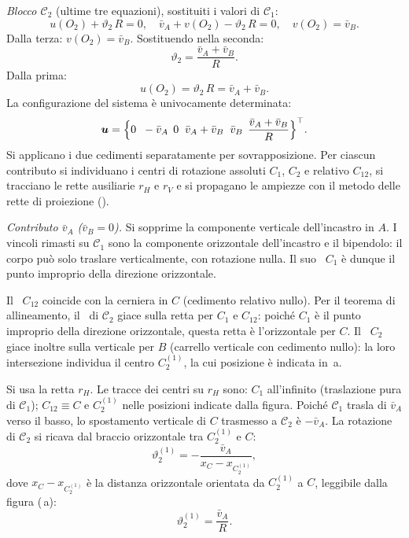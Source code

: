 \begin{esempio}
\begin{svolgimento}
		\noindent\textit{Blocco $\mathcal{C}_2$}
		(ultime tre equazioni), sostituiti i valori di
		$\mathcal{C}_1$:
		\begin{equation*}
			u(O_2) + \vartheta_2\,R = 0,\quad
			\bar{v}_A + v(O_2) - \vartheta_2\,R = 0,\quad
			v(O_2) = \bar{v}_B.
		\end{equation*}
		Dalla terza: $v(O_2) = \bar{v}_B$. Sostituendo
		nella seconda:
		\[
		\vartheta_2 = \frac{\bar{v}_A + \bar{v}_B}{R}.
		\]
		Dalla prima:
		\[
		u(O_2) = \vartheta_2\,R = \bar{v}_A + \bar{v}_B.
		\]
		La configurazione del sistema è univocamente
		determinata:
		\begin{equation*}
			\bm{u} =
			\Bigl\{
			0\;\;-\bar{v}_A\,\;0\;\;
			\bar{v}_A+\bar{v}_B\;\;\bar{v}_B\,\;
			\dfrac{\bar{v}_A+\bar{v}_B}{R}
			\Bigr\}^\top.
		\end{equation*}
		Si applicano i due cedimenti separatamente per
		sovrapposizione. Per ciascun contributo si
		individuano i centri di rotazione assoluti $C_1$,
		$C_2$ e relativo $C_{12}$, si tracciano le rette
		ausiliarie $r_H$ e $r_V$ e si propagano le
		ampiezze con il metodo delle rette di proiezione
		().
		
		\smallskip
		\noindent\textit{Contributo $\bar{v}_A$
			($\bar{v}_B = 0$).}
		Si sopprime la componente verticale dell'incastro
		in $A$. I vincoli rimasti su $\mathcal{C}_1$ sono
		la componente orizzontale dell'incastro e il
		bipendolo: il corpo può solo traslare verticalmente,
		con rotazione nulla. Il suo \CRa\ $C_1$ è dunque
		il punto improprio della direzione orizzontale.
		
		Il \CRr\ $C_{12}$ coincide con la cerniera in $C$
		(cedimento relativo nullo). Per il teorema di
		allineamento, il \CRa\ di $\mathcal{C}_2$ giace
		sulla retta per $C_1$ e $C_{12}$: poiché $C_1$ è
		il punto improprio della direzione orizzontale,
		questa retta è l'orizzontale per $C$. Il \CRa\
		$C_2$ giace inoltre sulla verticale per $B$
		(carrello verticale con cedimento nullo): la loro
		intersezione individua il centro $C_2^{(1)}$,
		la cui posizione è indicata in
		\,a.
		
		Si usa la retta $r_H$. Le tracce dei centri su
		$r_H$ sono: $C_1$ all'infinito (traslazione pura
		di $\mathcal{C}_1$); $C_{12}\equiv C$ e
		$C_2^{(1)}$ nelle posizioni indicate dalla figura.
		Poiché $\mathcal{C}_1$ trasla di $\bar{v}_A$ verso
		il basso, lo spostamento verticale di $C$ trasmesso
		a $\mathcal{C}_2$ è $-\bar{v}_A$. La rotazione di
		$\mathcal{C}_2$ si ricava dal braccio orizzontale
		tra $C_2^{(1)}$ e $C$:
		\[
		\vartheta_2^{(1)} =
		-\frac{\bar{v}_A}{x_C - x_{C_2^{(1)}}},
		\]
		dove $x_C - x_{C_2^{(1)}}$ è la distanza
		orizzontale orientata da $C_2^{(1)}$ a $C$,
		leggibile dalla figura (\,a):
		\[
		\vartheta_2^{(1)} = \frac{\bar{v}_A}{R}.
		\]
		

\end{svolgimento}
\end{esempio}
